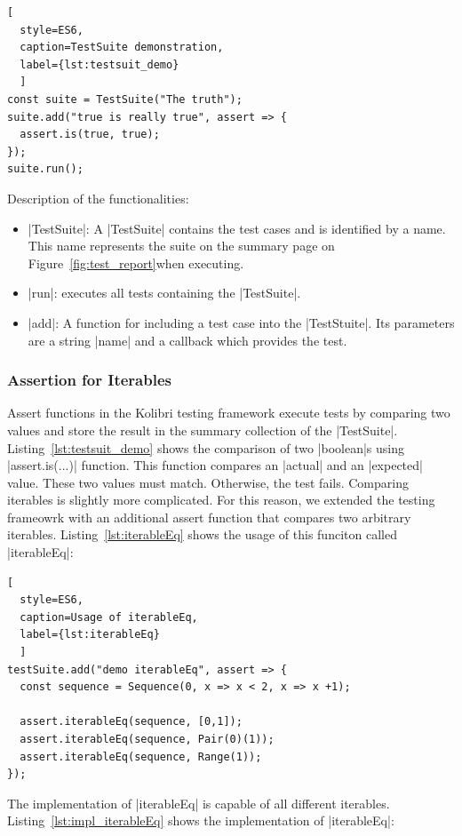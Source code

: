\begin{lstlisting}[
  style=ES6, 
  caption=TestSuite demonstration,
  label={lst:testsuit_demo}
  ]
const suite = TestSuite("The truth");
suite.add("true is really true", assert => {
  assert.is(true, true);
});
suite.run();
\end{lstlisting}

Description of the functionalities: 

\begin{itemize}
  \item{|TestSuite|: A |TestSuite| contains the test cases and is identified by a
    name. This name represents the suite on the summary page on
  Figure~\ref{fig:test_report}when executing.}
  \item{|run|: executes all tests containing the |TestSuite|.}
  \item{|add|: A function for including a test case into the |TestStuite|. Its
      parameters are a string |name| and a callback which provides the test.}
\end{itemize}


\subsubsection{Assertion for Iterables}
\label{subsub:Assertion for Iterables}
Assert functions in the Kolibri testing framework execute tests by comparing
two values and store the result in the summary collection of the |TestSuite|.
Listing~\ref{lst:testsuit_demo} shows the comparison of two |boolean|s using
|assert.is(...)| function.
This function compares an |actual| and an |expected| value. These two values
must match. Otherwise, the test fails.
\newline
Comparing iterables is slightly more complicated. For this reason, we extended
the testing frameowrk with an additional assert function that compares two
arbitrary iterables. Listing~\ref{lst:iterableEq} shows the usage of this
funciton called |iterableEq|:

\begin{lstlisting}[
  style=ES6, 
  caption=Usage of iterableEq,
  label={lst:iterableEq}
  ]
testSuite.add("demo iterableEq", assert => {
  const sequence = Sequence(0, x => x < 2, x => x +1);

  assert.iterableEq(sequence, [0,1]);
  assert.iterableEq(sequence, Pair(0)(1));
  assert.iterableEq(sequence, Range(1));
});  
\end{lstlisting}

The implementation of |iterableEq| is capable of all different iterables.
Listing~\ref{lst:impl_iterableEq} shows the implementation of |iterableEq|:

